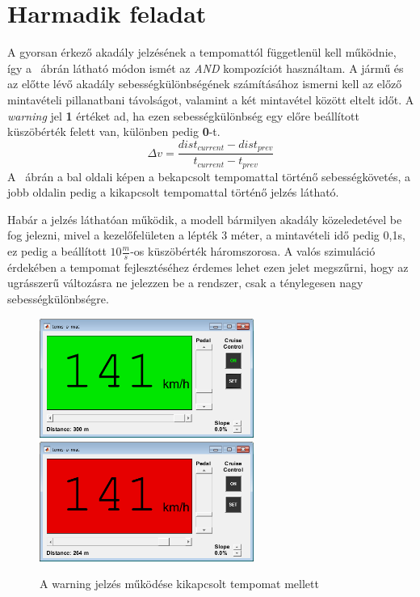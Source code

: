 \newpage
\section{Harmadik feladat}
A gyorsan érkező akadály jelzésének a tempomattól függetlenül kell működnie, így a ~ábrán látható módon ismét az \textit{AND} kompozíciót használtam. A jármű és az előtte lévő akadály sebességkülönbségének számításához ismerni kell az előző mintavételi pillanatbani távolságot, valamint a két mintavétel között eltelt időt. A \textit{warning} jel \textbf{1} értéket ad, ha ezen sebességkülönbség egy előre beállított küszöbérték felett van, különben pedig \textbf{0}-t.
\begin{equation}
	\Delta v=\frac{dist_{current}-dist_{prev}}{t_{current}-t_{prev}}\label{dv}
\end{equation}
A ~ábrán a bal oldali képen a bekapcsolt tempomattal történő sebességkövetés, a jobb oldalin pedig a kikapcsolt tempomattal történő jelzés látható.

Habár a jelzés láthatóan működik, a modell bármilyen akadály közeledetével be fog jelezni, mivel a kezelőfelületen a lépték 3 méter, a mintavételi idő pedig 0,1s, ez pedig a beállított $10 \frac{m}{s}$-os küszöbérték háromszorosa. A valós szimuláció érdekében a tempomat fejlesztéséhez érdemes lehet ezen jelet megszűrni, hogy az ugrásszerű változásra ne jelezzen be a rendszer, csak a ténylegesen nagy sebességkülönbségre.

\begin{figure}[!ht]
	\centering
	\includegraphics[width=70mm,keepaspectratio]{figures/2m04/f2_tempomat_1.png}	\includegraphics[width=70mm,keepaspectratio]{figures/2m04/f2_tempomat_2.png}
	\caption{A warning jelzés működése kikapcsolt tempomat mellett}
	\label{fig:warning}
\end{figure}


